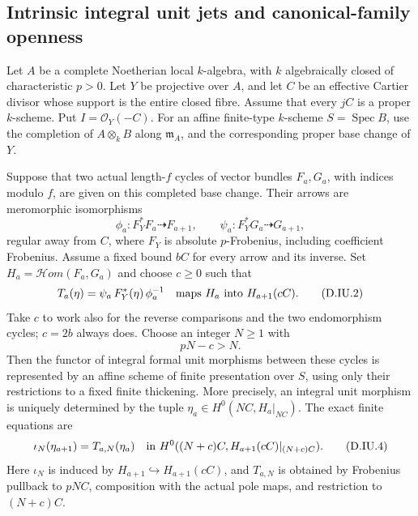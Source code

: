 \subsection{Intrinsic integral unit jets and canonical-family openness}

\begin{proposition}
\label{D:intrinsic-integral-unit-Hom-jets}
Let $A$ be a complete Noetherian local $k$-algebra, with $k$
algebraically closed of characteristic $p>0$. Let $Y$ be
projective over $A$, and let $C$ be an effective Cartier
divisor whose support is the entire closed fibre. Assume
that every $jC$ is a proper $k$-scheme. Put $I=\mathcal O_Y(-C)$.
For an affine finite-type $k$-scheme $S=\operatorname{Spec}B$,
use the completion of $A\otimes_k B$ along $\mathfrak m_A$,
and the corresponding proper base change of $Y$.

Suppose that two actual length-$f$ cycles of vector bundles
$F_a,G_a$, with indices modulo $f$, are given on this
completed base change. Their arrows are meromorphic
isomorphisms
\[
 \phi_a:F_Y^*F_a\dashrightarrow F_{a+1},\qquad
 \psi_a:F_Y^*G_a\dashrightarrow G_{a+1},
                                                        \tag{D.IU.1}
\]
regular away from $C$, where $F_Y$ is absolute $p$-Frobenius,
including coefficient Frobenius. Assume a fixed bound $bC$
for every arrow and its inverse. Set
$H_a=\mathcal Hom(F_a,G_a)$ and choose $c\ge0$ such that
\[
 T_a(\eta)=\psi_a\,F_Y^*(\eta)\,\phi_a^{-1}
       \quad\hbox{maps }H_a\hbox{ into }H_{a+1}(cC).
                                                        \tag{D.IU.2}
\]
Take $c$ to work also for the reverse comparisons and the
two endomorphism cycles; $c=2b$ always does. Choose an integer $N\ge1$ with
\[
                         pN-c>N.                       \tag{D.IU.3}
\]
Then the functor of integral formal unit morphisms between
these cycles is represented by an affine scheme of finite
presentation over $S$, using only their restrictions to a
fixed finite thickening. More precisely, an integral unit
morphism is uniquely determined by the tuple
$\eta_a\in H^0(NC,H_a|_{NC})$. The exact finite equations are
\[
 \iota_N(\eta_{a+1})=T_{a,N}(\eta_a)
 \quad\hbox{in }H^0((N+c)C,H_{a+1}(cC)|_{(N+c)C}).
                                                        \tag{D.IU.4}
\]
Here $\iota_N$ is induced by $H_{a+1}\hookrightarrow
H_{a+1}(cC)$, and $T_{a,N}$ is obtained by Frobenius
pullback to $pNC$, composition with the actual pole maps,
and restriction to $(N+c)C$.


\end{proposition}
